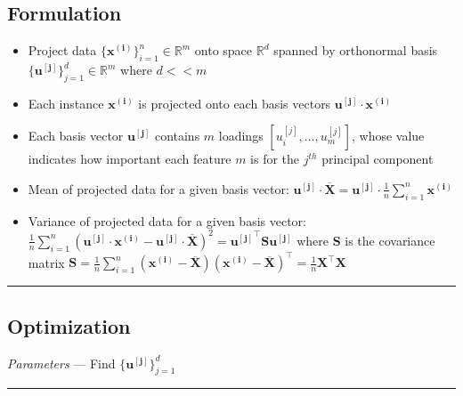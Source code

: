 \subsection*{Formulation}
\begin{itemize}
    \item Project data $\{\boldsymbol{x^{(i)}}\}_{i=1}^n \in \mathbb{R}^m$ onto space $\mathbb{R}^d$ spanned by orthonormal basis $\{\boldsymbol{u^{[j]}}\}_{j=1}^d \in \mathbb{R}^m$ where $d << m$
    \item Each instance $\boldsymbol{x^{(i)}}$ is projected onto each basis vectors $\boldsymbol{u^{[j]}} \cdot \boldsymbol{x^{(i)}}$
    \item Each basis vector $\boldsymbol{u^{[j]}}$ contains $m$ loadings $[u_i^{[j]}, ..., u_m^{[j]}]$, whose value indicates how important each feature $m$ is for the $j^{th}$ principal component
    \item Mean of projected data for a given basis vector: $\boldsymbol{u^{[j]}} \cdot \overline{\boldsymbol{X}} = \boldsymbol{u^{[j]}} \cdot \frac{1}{n} \sum_{i=1}^n \boldsymbol{x^{(i)}}$
    \item Variance of projected data for a given basis vector: $\frac{1}{n} \sum_{i=1}^n (\boldsymbol{u^{[j]}} \cdot \boldsymbol{x^{(i)}} - \boldsymbol{u^{[j]}} \cdot \overline{\boldsymbol{X}})^2 = \boldsymbol{u^{[j]}}^\intercal \boldsymbol{S} \boldsymbol{u^{[j]}}$ where $\boldsymbol{S}$ is the covariance matrix $\boldsymbol{S} = \frac{1}{n} \sum_{i=1}^n (\boldsymbol{x^{(i)}} - \overline{\boldsymbol{X}})(\boldsymbol{x^{(i)}} - \overline{\boldsymbol{X}})^\intercal = \frac{1}{n} \boldsymbol{X}^\intercal \boldsymbol{X}$
\end{itemize}

{\color{black}\hrule height 0.001mm}

\subsection*{Optimization}
\emph{Parameters} --- Find $\{\boldsymbol{u^{[j]}}\}_{j=1}^d$

{\color{lightgray}\hrule height 0.001mm}

